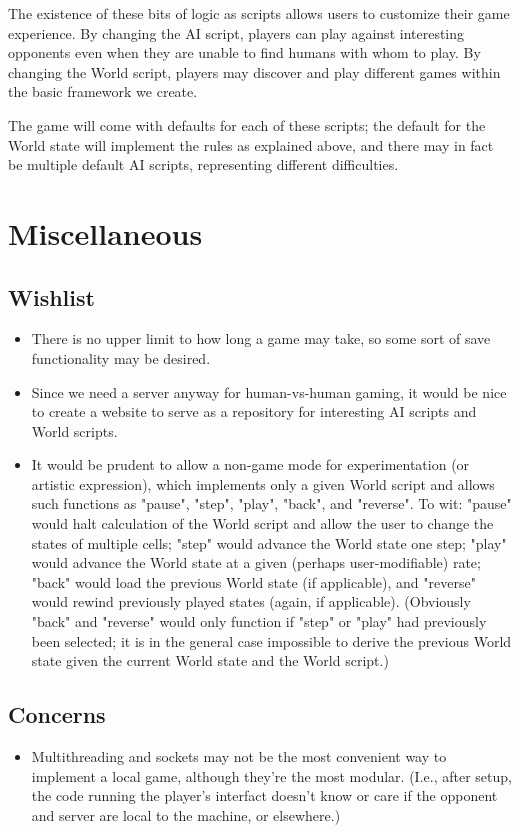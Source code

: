 \documentclass[letterpaper]{article}
\begin{document}
The existence of these bits of logic as scripts allows users to customize their game experience. By changing the AI script, players can play against interesting opponents even when they are unable to find humans with whom to play. By changing the World script, players may discover and play different games within the basic framework we create.

The game will come with defaults for each of these scripts; the default for the World state will implement the rules as explained above, and there may in fact be multiple default AI scripts, representing different difficulties.

\section{Miscellaneous}

\subsection{Wishlist}

\begin{itemize}
	\item There is no upper limit to how long a game may take, so some sort of save functionality may be desired.
	\item Since we need a server anyway for human-vs-human gaming, it would be nice to create a website to serve as a repository for interesting AI scripts and World scripts.
	\item It would be prudent to allow a non-game mode for experimentation (or artistic expression), which implements only a given World script and allows such functions as "pause", "step", "play", "back", and "reverse". To wit: "pause" would halt calculation of the World script and allow the user to change the states of multiple cells; "step" would advance the World state one step; "play" would advance the World state at a given (perhaps user-modifiable) rate; "back" would load the previous World state (if applicable), and "reverse" would rewind previously played states (again, if applicable). (Obviously "back" and "reverse" would only function if "step" or "play" had previously been selected; it is in the general case impossible to derive the previous World state given the current World state and the World script.)
\end{itemize}

\subsection{Concerns}

\begin{itemize}
	\item Multithreading and sockets may not be the most convenient way to implement a local game, although they're the most modular. (I.e., after setup, the code running the player's interfact doesn't know or care if the opponent and server are local to the machine, or elsewhere.)
\end{itemize}
\end{document}
